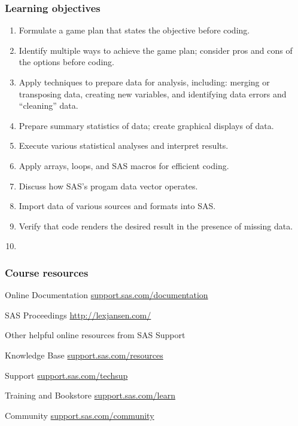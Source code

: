 \begin{frame}
\frametitle{Learning objectives}
\begin{enumerate}
\item Formulate a game plan that states the objective before coding.
\item Identify multiple ways to achieve the game plan; consider pros and cons of the options before coding.
\item Apply techniques to prepare data for analysis, including: merging or transposing data, creating new variables, and identifying data errors and ``cleaning'' data.
\item Prepare summary statistics of data; create graphical displays of data.
\item Execute various statistical analyses and interpret results.
\item Apply arrays, loops, and SAS macros for efficient coding.
\item Discuss how SAS's progam data vector operates.
\item Import data of various sources and formats into SAS.
\item Verify that code renders the desired result in the presence of missing data.
\item[]
\end{enumerate}
\end{frame}




\begin{frame}
\frametitle{Course resources}
\bi

\item Online Documentation \url{support.sas.com/documentation}
\item[]

\item SAS Proceedings \url{http://lexjansen.com/}
\item[]

\item Other helpful online resources from SAS Support
	\bi
	\item[] Knowledge Base \url{support.sas.com/resources}
	\item[] Support \url{support.sas.com/techsup}
	\item[] Training and Bookstore \url{support.sas.com/learn}
	\item[] Community \url{support.sas.com/community}
	\ei
\ei
\end{frame}

